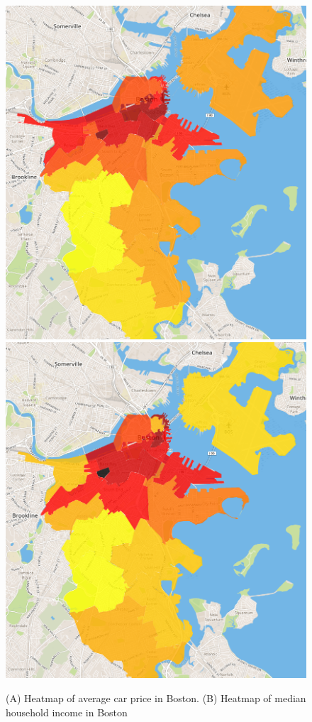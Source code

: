 \documentclass[10pt,twocolumn,letterpaper]{article}
\begin{document}
\begin{figure}[t]
\begin{center}

    \includegraphics[width=0.45\linewidth]{img/price.png}
    \includegraphics[width=0.45\linewidth]{img/income.png}
\end{center}
   \caption {(A) Heatmap of average car price in Boston. (B) Heatmap of median household income in Boston}
\label{fig:bosvis}
\end{figure}
\end{document}
